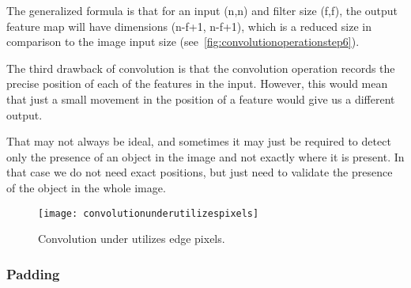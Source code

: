 \begin{bulletedlist}
		\item The generalized formula is that for an input (n,n) and filter size (f,f), the output feature map will have dimensions (n-f+1, n-f+1), which is a reduced size in comparison to the image input size (see~\ref{fig:convolutionoperationstep6}).
		\item The third drawback of convolution is that the convolution operation records the precise position of each of the features in the input. However, this would mean that just a small movement in the position of a feature would give us a different output.
		\item That may not always be ideal, and sometimes it may just be required to detect only the presence of an object in the image and not exactly where it is present.  In that case we do not need exact positions, but just need to validate the presence of the object in the whole image.
	\end{bulletedlist}

	\begin{figure}[h]
		\centering
		\texttt{[image: convolutionunderutilizespixels]}
		\caption{Convolution under utilizes edge pixels.}
		\label{fig:convolutionunderutilizespixels}
	\end{figure}

	\subsubsection{Padding}

